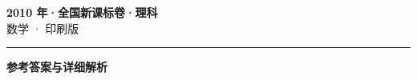 \documentclass[zihao=5, a4paper]{ctexart}
\begin{document}
\begin{center}
  {\Large\bfseries 2010 年·全国新课标卷·理科}\\[4pt]
  {\large 数学 · 印刷版}
\end{center}
\medskip
{}

\par\bigskip\hrule\bigskip
{}
\begin{center}{\large\bfseries 参考答案与详细解析}\end{center}
\smallskip

\end{document}
